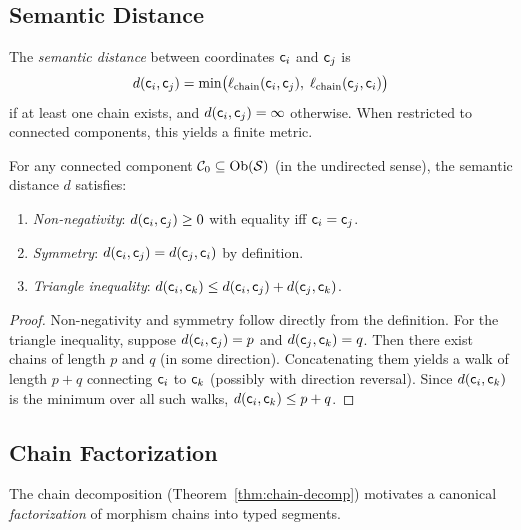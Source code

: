\documentclass[11pt]{article}
\newcommand{\ChainLen}{\ell_{\mathrm{chain}}}
\begin{document}
\subsection{Semantic Distance}\label{sec:sem-distance}

\begin{definition}\label{def:sem-dist}
The \emph{semantic distance} between coordinates $\mathsf{c}_i$ and $\mathsf{c}_j$ is
\[
  d(\coord_i, \coord_j) = \min\bigl(\ChainLen(\coord_i, \coord_j),\;
  \ChainLen(\coord_j, \coord_i)\bigr)
\]
if at least one chain exists, and $d(\mathsf{c}_i, \mathsf{c}_j) = \infty$
otherwise.  When restricted to connected components, this yields a finite
metric.
\end{definition}

\begin{proposition}\label{prop:metric-space}
For any connected component $\mathcal{C}_0 \subseteq \mathrm{Ob}(\mathcal{S})$ (in the
undirected sense), the semantic distance $d$ satisfies:
\begin{enumerate}[noitemsep]
  \item \emph{Non-negativity}: $d(\mathsf{c}_i, \mathsf{c}_j) \geq 0$ with
        equality iff $\mathsf{c}_i = \mathsf{c}_j$.
  \item \emph{Symmetry}: $d(\mathsf{c}_i, \mathsf{c}_j) = d(\mathsf{c}_j, \mathsf{c}_i)$
        by definition.
  \item \emph{Triangle inequality}: $d(\mathsf{c}_i, \mathsf{c}_k) \leq
        d(\mathsf{c}_i, \mathsf{c}_j) + d(\mathsf{c}_j, \mathsf{c}_k)$.
\end{enumerate}
\end{proposition}

\begin{proof}
Non-negativity and symmetry follow directly from the definition.  For the
triangle inequality, suppose $d(\mathsf{c}_i, \mathsf{c}_j) = p$ and
$d(\mathsf{c}_j, \mathsf{c}_k) = q$.  Then there exist chains of length $p$ and $q$
(in some direction).  Concatenating them yields a walk of length $p + q$
connecting $\mathsf{c}_i$ to $\mathsf{c}_k$ (possibly with direction reversal).
Since $d(\mathsf{c}_i, \mathsf{c}_k)$ is the minimum over all such walks,
$d(\mathsf{c}_i, \mathsf{c}_k) \leq p + q$.
\end{proof}

\subsection{Chain Factorization}\label{sec:chain-factor}

The chain decomposition (Theorem~\ref{thm:chain-decomp}) motivates a
canonical \emph{factorization} of morphism chains into typed segments.
\end{document}
